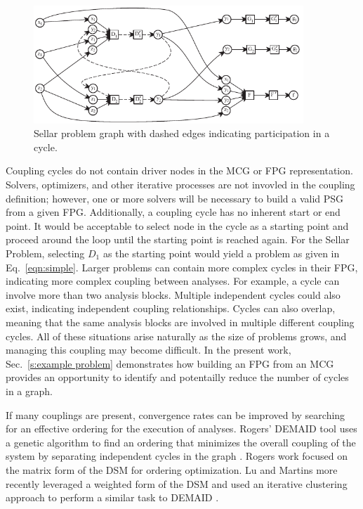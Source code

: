  \begin{figure}[htb!]
  \begin{center}
    \includegraphics[width=4.0in]{images/sellar_cycles}
  \end{center}
    \caption{Sellar problem graph with dashed edges indicating participation in a cycle.
\label{f:sellar cycles}
    }
\end{figure} 

  Coupling cycles do not contain driver nodes in the MCG or FPG representation. 
  Solvers, optimizers, and other iterative processes are not invovled in the coupling 
  definition; however, one or more solvers will be necessary to build a valid PSG from a given FPG. 
  Additionally, a coupling cycle has no inherent start or end point. It would be acceptable to select
  node in the cycle as a starting point and proceed around the
  loop until the starting point is reached again. For the Sellar Problem, selecting 
  $D_1$ as the starting point would yield a problem as given in 
  Eq.~\ref{eqn:simple}.
  Larger problems can contain more complex cycles in their FPG, indicating more 
  complex coupling between analyses. For example, a cycle can involve more than 
   two analysis blocks. Multiple independent cycles could also exist, indicating 
  independent coupling relationships. Cycles can also overlap, meaning that the same analysis 
  blocks are involved in multiple different coupling cycles. All of these situations
  arise naturally as the size of problems grows, and managing this coupling may
  become difficult. In the present work, Sec.~\ref{s:example problem}
  demonstrates how building an FPG from an MCG provides an opportunity to 
  identify and potentailly reduce the number of cycles in a graph. 

  If many couplings are present, convergence rates can be improved by 
  searching for an effective ordering for the execution of analyses.
  Rogers' DEMAID tool uses a genetic algorithm to find an ordering that minimizes 
  the overall coupling of the system by separating independent cycles in the 
  graph \cite{rogers1996,rogers1996demaid}. Rogers work focused on the matrix 
  form of the DSM for ordering optimization. Lu and Martins more recently leveraged 
  a weighted form of the DSM and used an iterative clustering approach to perform a 
  similar task to DEMAID \cite{Lu2012}.

